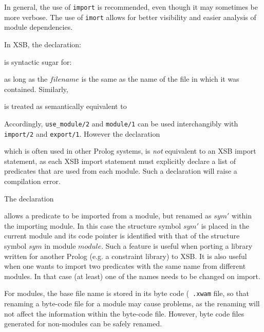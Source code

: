 In general, the use of {\tt import} is recommended, even though it may
sometimes be more verbose.  The use of {\tt imort} allows for better
visibility and easier analysis of module dependencies.

In XSB, the declaration:


\noindent
is syntactic sugar for:


\noindent
as long as the $filename$ is the same as the name of the file in which
it was contained.  Similarly,


\noindent
is treated as semantically equivalent to 


\noindent
Accordingly, {\tt use\_module/2} and {\tt module/1} can be used
interchangibly with {\tt import/2} and {\tt export/1}.  However the
declaration


\noindent
which is often used in other Prolog systems, is {\em not} equivalent
to an XSB import statement, as each XSB import statement must
explicitly declare a list of predicates that are used from each
module.  Such a declaration will raise a compilation error.

The declaration 


\noindent
allows a predicate to be imported from a module, but renamed as $sym'$
within the importing module.  In this case the structure symbol $sym'$
is placed in the current module and its code pointer is identified
with that of the structure symbol $sym$ in module $module$.  Such a
feature is useful when porting a library written for another Prolog
(e.g. a constraint library) to XSB.  It is also useful when one wants
to import two predicates with the same name from different modules.
In that case (at least) one of the names needs to be changed on
import.

For modules, the base file name is stored in its byte code ({\tt
  .xwam} file, so that renaming a byte-code file for a module may cause
problems, as the renaming will not affect the information within the
byte-code file.  However, byte code files generated for non-modules
can be safely renamed.

